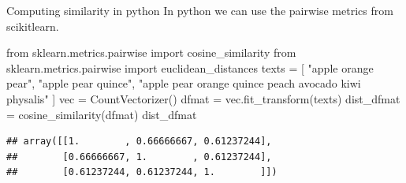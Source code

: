 \documentclass[
  10pt,
  ignorenonframetext,
  aspectratio=169]{beamer}
\newenvironment{Shaded}{\begin{snugshade}}{\end{snugshade}}
\newcommand{\ImportTok}[1]{\textcolor[rgb]{0.80,0.80,0.80}{#1}}
\newcommand{\NormalTok}[1]{\textcolor[rgb]{0.80,0.80,0.80}{#1}}
\newcommand{\OperatorTok}[1]{\textcolor[rgb]{0.94,0.94,0.82}{#1}}
\newcommand{\StringTok}[1]{\textcolor[rgb]{0.80,0.58,0.58}{#1}}
\begin{document}
\begin{frame}[fragile]{Computing similarity in python}
\protect\hypertarget{computing-similarity-in-python}{}
In python we can use the pairwise metrics from scikitlearn.

\scriptsize

\begin{Shaded}
\begin{Highlighting}[]
\ImportTok{from}\NormalTok{ sklearn.metrics.pairwise }\ImportTok{import}\NormalTok{ cosine\_similarity}
\ImportTok{from}\NormalTok{ sklearn.metrics.pairwise }\ImportTok{import}\NormalTok{ euclidean\_distances}
\NormalTok{texts }\OperatorTok{=}\NormalTok{ [}
  \StringTok{"apple orange pear"}\NormalTok{, }\StringTok{"apple pear quince"}\NormalTok{,}
  \StringTok{"apple pear orange quince peach avocado kiwi physalis"}
\NormalTok{]}
\NormalTok{vec }\OperatorTok{=}\NormalTok{ CountVectorizer()}
\NormalTok{dfmat }\OperatorTok{=}\NormalTok{ vec.fit\_transform(texts)}
\NormalTok{dist\_dfmat }\OperatorTok{=}\NormalTok{ cosine\_similarity(dfmat)}
\NormalTok{dist\_dfmat}
\end{Highlighting}
\end{Shaded}

\begin{verbatim}
## array([[1.        , 0.66666667, 0.61237244],
##        [0.66666667, 1.        , 0.61237244],
##        [0.61237244, 0.61237244, 1.        ]])
\end{verbatim}
\end{frame}
\end{document}
